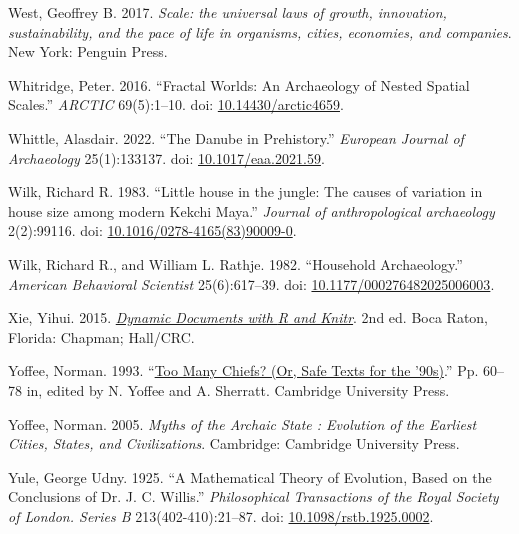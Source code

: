 \documentclass[
  12pt,
]{book}
\newlength{\cslhangindent}
\newlength{\cslentryspacingunit} %
\newenvironment{CSLReferences}[2] %
 {%
  \setlength{\parindent}{0pt}
  \ifodd #1
  \let\oldpar\par
  \def\par{\hangindent=\cslhangindent\oldpar}
  \fi
  \setlength{\parskip}{#2\cslentryspacingunit}
 }%
 {}
\begin{document}
\begin{CSLReferences}{1}{0}
\leavevmode{}%
West, Geoffrey B. 2017. \emph{Scale: the universal laws of growth, innovation, sustainability, and the pace of life in organisms, cities, economies, and companies}. New York: Penguin Press.

\leavevmode{}%
Whitridge, Peter. 2016. {``Fractal Worlds: An Archaeology of Nested Spatial Scales.''} \emph{ARCTIC} 69(5):1--10. doi: \href{https://doi.org/10.14430/arctic4659}{10.14430/arctic4659}.

\leavevmode{}%
Whittle, Alasdair. 2022. {``The Danube in Prehistory.''} \emph{European Journal of Archaeology} 25(1):133137. doi: \href{https://doi.org/10.1017/eaa.2021.59}{10.1017/eaa.2021.59}.

\leavevmode{}%
Wilk, Richard R. 1983. {``Little house in the jungle: The causes of variation in house size among modern Kekchi Maya.''} \emph{Journal of anthropological archaeology} 2(2):99116. doi: \href{https://doi.org/10.1016/0278-4165(83)90009-0}{10.1016/0278-4165(83)90009-0}.

\leavevmode{}%
Wilk, Richard R., and William L. Rathje. 1982. {``Household Archaeology.''} \emph{American Behavioral Scientist} 25(6):617--39. doi: \href{https://doi.org/10.1177/000276482025006003}{10.1177/000276482025006003}.

\leavevmode{}%
Xie, Yihui. 2015. \emph{\href{http://yihui.name/knitr/}{Dynamic Documents with {R} and Knitr}}. 2nd ed. Boca Raton, Florida: Chapman; Hall/CRC.

\leavevmode{}%
Yoffee, Norman. 1993. {``\href{https://doi.org/10.1017/CBO9780511720277.007}{Too Many Chiefs? (Or, Safe Texts for the '90s)}.''} Pp. 60--78 in, edited by N. Yoffee and A. Sherratt. Cambridge University Press.

\leavevmode{}%
Yoffee, Norman. 2005. \emph{Myths of the Archaic State : Evolution of the Earliest Cities, States, and Civilizations}. Cambridge: Cambridge University Press.

\leavevmode{}%
Yule, George Udny. 1925. {``A Mathematical Theory of Evolution, Based on the Conclusions of Dr. J. C. Willis.''} \emph{Philosophical Transactions of the Royal Society of London. Series B} 213(402-410):21--87. doi: \href{https://doi.org/10.1098/rstb.1925.0002}{10.1098/rstb.1925.0002}.


\end{CSLReferences}
\end{document}
